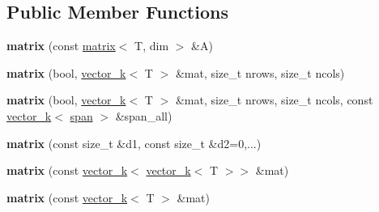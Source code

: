 \subsection*{Public Member Functions}
\begin{DoxyCompactItemize}
\item 
\hypertarget{classkeycpp_1_1matrix_3_01_t_00_01dim_00_01_d_e_n_s_e___m_a_t_r_i_x_01_4_ab8db981afb6350b1959fa91116d898d5}{{\bfseries matrix} (const \hyperlink{classkeycpp_1_1matrix}{matrix}$<$ T, dim $>$ \&A)}\label{classkeycpp_1_1matrix_3_01_t_00_01dim_00_01_d_e_n_s_e___m_a_t_r_i_x_01_4_ab8db981afb6350b1959fa91116d898d5}

\item 
\hypertarget{classkeycpp_1_1matrix_3_01_t_00_01dim_00_01_d_e_n_s_e___m_a_t_r_i_x_01_4_a47b2d08a3a0c913f64c0fb2c1f214d4c}{{\bfseries matrix} (bool, \hyperlink{classkeycpp_1_1vector__k}{vector\-\_\-k}$<$ T $>$ \&mat, size\-\_\-t nrows, size\-\_\-t ncols)}\label{classkeycpp_1_1matrix_3_01_t_00_01dim_00_01_d_e_n_s_e___m_a_t_r_i_x_01_4_a47b2d08a3a0c913f64c0fb2c1f214d4c}

\item 
\hypertarget{classkeycpp_1_1matrix_3_01_t_00_01dim_00_01_d_e_n_s_e___m_a_t_r_i_x_01_4_af1e35182cdd32bd7fb2b92c421a24cc0}{{\bfseries matrix} (bool, \hyperlink{classkeycpp_1_1vector__k}{vector\-\_\-k}$<$ T $>$ \&mat, size\-\_\-t nrows, size\-\_\-t ncols, const \hyperlink{classkeycpp_1_1vector__k}{vector\-\_\-k}$<$ \hyperlink{classkeycpp_1_1span}{span} $>$ \&span\-\_\-all)}\label{classkeycpp_1_1matrix_3_01_t_00_01dim_00_01_d_e_n_s_e___m_a_t_r_i_x_01_4_af1e35182cdd32bd7fb2b92c421a24cc0}

\item 
\hypertarget{classkeycpp_1_1matrix_3_01_t_00_01dim_00_01_d_e_n_s_e___m_a_t_r_i_x_01_4_a605bfa9d85fdfd6a85f81688be389f64}{{\bfseries matrix} (const size\-\_\-t \&d1, const size\-\_\-t \&d2=0,...)}\label{classkeycpp_1_1matrix_3_01_t_00_01dim_00_01_d_e_n_s_e___m_a_t_r_i_x_01_4_a605bfa9d85fdfd6a85f81688be389f64}

\item 
\hypertarget{classkeycpp_1_1matrix_3_01_t_00_01dim_00_01_d_e_n_s_e___m_a_t_r_i_x_01_4_a4843f12eb9e6a7b463fbea9da1e972e3}{{\bfseries matrix} (const \hyperlink{classkeycpp_1_1vector__k}{vector\-\_\-k}$<$ \hyperlink{classkeycpp_1_1vector__k}{vector\-\_\-k}$<$ T $>$$>$ \&mat)}\label{classkeycpp_1_1matrix_3_01_t_00_01dim_00_01_d_e_n_s_e___m_a_t_r_i_x_01_4_a4843f12eb9e6a7b463fbea9da1e972e3}

\item 
\hypertarget{classkeycpp_1_1matrix_3_01_t_00_01dim_00_01_d_e_n_s_e___m_a_t_r_i_x_01_4_acf06c77967a348fa86eb2216c3140fbb}{{\bfseries matrix} (const \hyperlink{classkeycpp_1_1vector__k}{vector\-\_\-k}$<$ T $>$ \&mat)}\label{classkeycpp_1_1matrix_3_01_t_00_01dim_00_01_d_e_n_s_e___m_a_t_r_i_x_01_4_acf06c77967a348fa86eb2216c3140fbb}


\end{DoxyCompactItemize}

